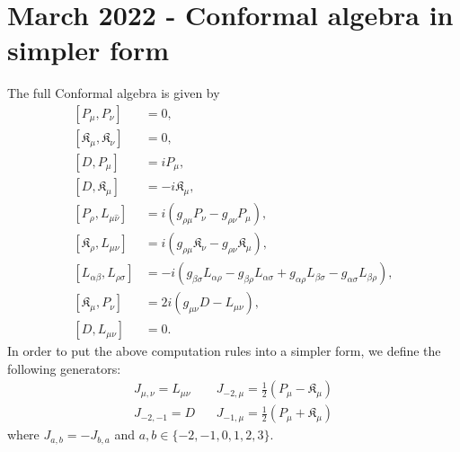 \documentclass[]{article}
\numberwithin{equation}{section}
\begin{document}
{{\section{March 2022 - Conformal algebra in simpler form}
  The full Conformal algebra is given by
\begin{align}
    \left[P_{{\mu}},P_{{\nu}}\right]&=0,\\
    \left[\mathfrak{K}_{{\mu}},\mathfrak{K}_{{\nu}}\right]&=0,\\
 \left[D, P_{{\mu}}\right]&=iP_{{\mu}},\\
 \left[D, \mathfrak{K}_{{\mu}}\right]&=-i\mathfrak{K}_{{\mu}},\\
 \left[P_{{\rho}},L_{{\mu}\hat{\nu}}\right]&=i\left(g_{{\rho}{\mu}}P_{{\nu}}-g_{{\rho}{\nu}}P_{{\mu}}\right),\\
 \left[\mathfrak{K}_{{\rho}},L_{{\mu}{\nu}}\right]&=i\left(g_{{\rho}{\mu}}\mathfrak{K}_{{\nu}}-g_{{\rho}{\nu}}\mathfrak{K}_{{\mu}}\right),\\
 \left[L_{{\alpha}{\beta}},L_{{\rho}{\sigma}}\right]&=-i\left(g_{{\beta}{\sigma}}L_{{\alpha}{\rho}}-g_{{\beta}{\rho}}L_{{\alpha}{\sigma}}+g_{{\alpha}{\rho}}L_{{\beta}{\sigma}}-g_{{\alpha}{\sigma}}L_{{\beta}{\rho}}\right),\\
 \left[\mathfrak{K}_{{\mu}},P_{{\nu}}\right]&=2i\left(g_{{\mu}{\nu}}D-L_{{\mu}{\nu}}\right),\\
 \left[D, L_{{\mu}{\nu}}\right]&=0.
\end{align} 
In order to put the above computation rules into a simpler form, we define the following generators:
\begin{align}
    J_{\mu,\nu}=L_{\mu\nu}~~&~~J_{-2,\mu}=\frac{1}{2}(P_\mu-\mathfrak{K}_\mu)\nonumber\\
    J_{-2,-1}=D~~&~~J_{-1,\mu}=\frac{1}{2}(P_\mu+\mathfrak{K}_\mu)\nonumber
\end{align}
where $J_{a,b}=-J_{b,a}$ and $a,b\in\{-2,-1,0,1,2,3\}$.


}}
\end{document}
